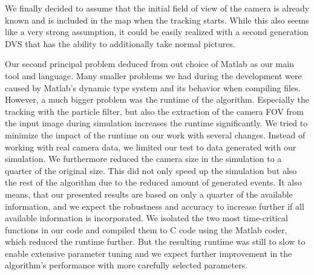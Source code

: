 We finally decided to assume that the initial field of view of the camera is already
known and is included in the map when the tracking starts. While this also seems like
a very strong assumption, it could be easily realized with a second generation DVS that
has the ability to additionally  take normal pictures.

Our second principal problem deduced from out choice of Matlab as our main tool and language.
Many smaller problems we had during the development were caused by Matlab's dynamic type system
and its behavior when compiling files.
However, a much bigger problem was the runtime of the algorithm. Especially the tracking with
the particle filter, but also the extraction of the camera FOV from the input image during
simulation increases the runtime significantly.
We tried to minimize the impact of the runtime on our work with several changes.
Instead of working with real camera data, we limited our test to data generated with our simulation.
We furthermore reduced the camera size in the simulation to a quarter of the original size.
This did not only speed up the simulation but also the rest of the algorithm due to the
reduced amount of generated events. It also means, that our presented results are based on
only a quarter of the available information, and we expect the robustness and accuracy to
increase further if all available information is incorporated.
We isolated the two most time-critical functions in our code and compiled them to C code using
the Matlab coder, which reduced the runtime further.
But the resulting runtime was still to slow to enable extensive parameter tuning and
we expect further improvement in the algorithm's performance with more carefully selected parameters.
